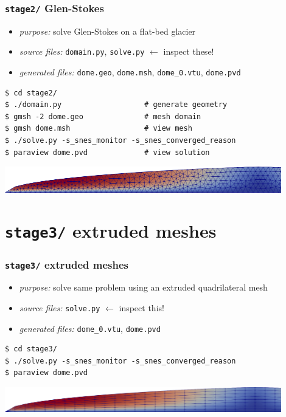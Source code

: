 \documentclass[10pt,hyperref,dvipsnames]{beamer}
\begin{document}
\begin{frame}[fragile]
\frametitle{\texttt{stage2/} \qquad Glen-Stokes}

\begin{itemize}
\item \emph{purpose:} solve Glen-Stokes on a flat-bed glacier
\item \emph{source files:} \texttt{domain.py}, \texttt{solve.py} \hfill \alert{$\gets$ inspect these!}
\item \emph{generated files:} \texttt{dome.geo}, \texttt{dome.msh}, \texttt{dome\_0.vtu}, \texttt{dome.pvd}
\end{itemize}

\bigskip
\begin{Verbatim}
$ cd stage2/
$ ./domain.py                   # generate geometry
$ gmsh -2 dome.geo              # mesh domain
$ gmsh dome.msh                 # view mesh
$ ./solve.py -s_snes_monitor -s_snes_converged_reason
$ paraview dome.pvd             # view solution
\end{Verbatim}

\vspace{10mm}
\begin{center}
\includegraphics[width=0.9\textwidth]{figs/stage2.png}
\end{center}
\end{frame}


\section{\texttt{stage3/} \qquad extruded meshes}

\begin{frame}[fragile]
\frametitle{\texttt{stage3/} \qquad extruded meshes}

\begin{itemize}
\item \emph{purpose:} solve same problem using an extruded quadrilateral mesh
\item \emph{source files:} \texttt{solve.py} \hfill \alert{$\gets$ inspect this!}
\item \emph{generated files:} \texttt{dome\_0.vtu}, \texttt{dome.pvd}
\end{itemize}

\bigskip
\begin{Verbatim}
$ cd stage3/
$ ./solve.py -s_snes_monitor -s_snes_converged_reason
$ paraview dome.pvd
\end{Verbatim}

\vspace{10mm}
\begin{center}
\includegraphics[width=0.9\textwidth]{figs/stage3.png}
\end{center}
\end{frame}
\end{document}
